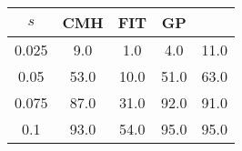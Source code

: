 \centering \begin{tabular}{c|c|c|c|c}
$s$	&CMH	&FIT	&GP	&\sc{Clear}\\\hline
0.025	&9.0	&1.0	&4.0	&11.0\\
0.05	&53.0	&10.0	&51.0	&63.0\\
0.075	&87.0	&31.0	&92.0	&91.0\\
0.1	&93.0	&54.0	&95.0	&95.0\\
\end{tabular}
